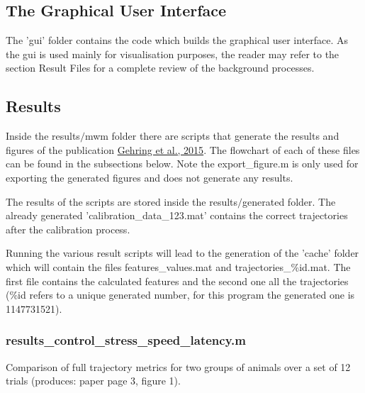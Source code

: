 \documentclass[12pt,titlepage]{article}
\begin{document}
\begin{doublespace}
\subsection{The Graphical User Interface}
The 'gui' folder contains the code which builds the graphical user interface. As the gui is used mainly for visualisation purposes, the reader may refer to the section Result Files for a complete review of the background processes.

\subsection{Results}
Inside the results$/$mwm folder there are scripts that generate the results and figures of the publication \href{http://www.nature.com/articles/srep14562}{Gehring et al., 2015}. The flowchart of each of these files can be found in the subsections below. Note the export\_figure.m is only used for exporting the generated figures and does not generate any results. 

The results of the scripts are stored inside the results$/$generated folder. The already generated 'calibration\_data\_123.mat' contains the correct trajectories after the calibration process.

Running the various result scripts will lead to the generation of the 'cache' folder which will contain the files features\_values.mat and trajectories\_\%id.mat. The first file contains the calculated features and the second one all the trajectories (\%id refers to a unique generated number, for this program the generated one is 1147731521). 

\subsubsection{results\_control\_stress\_speed\_latency.m}
Comparison of full trajectory metrics for two groups of animals over a set of 12 trials (produces: paper page 3, figure 1).


\end{doublespace}
\end{document}
